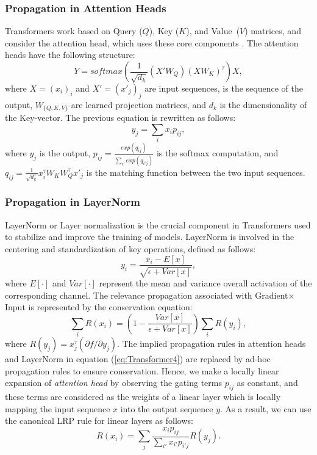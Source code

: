 \documentclass[final,5p,times,twocolumn]{elsarticle}
\begin{document}
\subsubsection{Propagation in Attention Heads}
Transformers work based on Query ($Q$), Key ($K$), and Value~($V$) matrices, and consider the attention head, which uses these core components \cite{vaswani2017attention}. The attention heads have the following structure:
\begin{equation}
Y=softmax(\frac{1}{\sqrt{d_{k}}}(X'W_{Q})(XW_{K})^\tau )X, \label{eq:Transformer5}    
\end{equation}
where $X=(x_{i})_{i}$ and $X'=(x'_{j})_{j}$ are input sequences,   is the sequence of the output, $W_{\{Q,K,V\}}$ are learned projection matrices, and $d_{k}$ is the dimensionality of the Key-vector. The previous equation is rewritten as follows:
\begin{equation}
y_{j}=\sum_{i} x_{i} p_{ij},    
\end{equation}
where $y_{j}$ is the output, $p_{ij}=\frac{exp(q_{ij})}{\sum_{i'}exp(q_{i'j})}$ is the softmax computation,
and $q_{ij}=\frac{1}{\sqrt{d_{k}}}x_{i}^\tau W_{K}W_{Q}^\tau x'_{j}$ is the matching function between the two input sequences. 


\subsubsection{Propagation in LayerNorm}
LayerNorm or Layer normalization is the crucial component in Transformers used to stabilize and improve the training of models. LayerNorm is involved in the centering and standardization of key operations, defined as follows:
\begin{equation}
y_{i}= \frac{x_{i}-E[x]}{\sqrt{\epsilon + Var[x]}},     
\end{equation}
where $E[\cdot]$ and $Var[\cdot]$ represent the mean and variance overall activation of the corresponding channel. The relevance propagation associated with Gradient$\times$Input is represented by the conservation equation:
\begin{equation}
\sum_{i}R(x_{i})=(1-\frac{Var[x]}{\epsilon+Var[x]}) \sum_{i}R(y_{i}),    
\end{equation}
where $R(y_{j})=x_{j}^\tau (\partial f/\partial y_{j})$.
The implied propagation rules in attention heads and LayerNorm in equation (\ref{eq:Transformer4}) are replaced by ad-hoc propagation rules to ensure conservation. Hence, we make a locally linear expansion of \textit{attention head} by observing the gating terms $p_{ij}$ as constant, and these terms are considered as the weights of a linear layer which is locally mapping the input sequence $x$ into the output sequence $y$. As a result, we can use the canonical LRP rule for linear layers as follows:
\begin{equation}
R(x_{i})=\sum_{j}\frac{x_{i}p_{ij}}{\sum_{i'}x_{i'}p_{i'j}}R(y_{j}). %
\end{equation}
\end{document}
